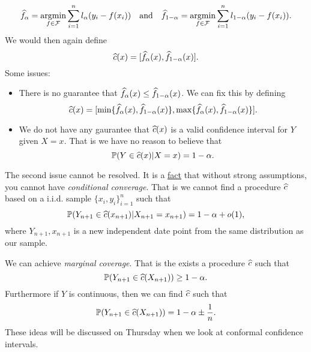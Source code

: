 \[\widehat{f}_{\alpha} = \operatorname*{argmin}_{f\in{\mathcal{F}}} \sum_{i=1}^n l_{\alpha}(y_i-f(x_i))~~~\text{and}~~~ \widehat{f}_{1-{\alpha}} = \operatorname*{argmin}_{f\in {\mathcal{F}}}\sum_{i=1}^n l_{1-{\alpha}}(y_i-f(x_i)).\]
We would then again define
\[\widehat{c}(x)=[\widehat{f}_{\alpha}(x), \widehat{f}_{1-{\alpha}}(x)]. \]
Some issues:
\begin{itemize}
    \item There is no guarantee that $\widehat{f}_{\alpha}(x) \le \widehat{f}_{1-{\alpha}}(x)$. We can fix this by defining
    \[\widehat{c}(x)=[\min\{\widehat{f}_{\alpha}(x), \widehat{f}_{1-{\alpha}}(x)\},\max\{\widehat{f}_{\alpha}(x), \widehat{f}_{1-{\alpha}}(x)\}]. \]
    \item We do not have any gaurantee that $\widehat{c}(x)$ is a valid confidence interval for $Y$ given $X=x$. That is we have no reason to believe that
    \[{\mathbb{P}}(Y \in \widehat{c}(x)|X=x)=1-{\alpha}. \]
\end{itemize}
The second issue cannot be resolved. It is a \underline{fact} that without strong assumptions, you cannot have \emph{conditional converage}. That is we cannot find a procedure $\widehat{c}$ based on a i.i.d. sample $\{x_i,y_i\}_{i=1}^n$ such that 
\[{\mathbb{P}}(Y_{n+1}\in \widehat{c}(x_{n+1})|X_{n+1}=x_{n+1})=1-{\alpha}+o(1), \]
where $Y_{n+1},x_{n+1}$ is a new independent date point from the same distribution as our sample. 

We can achieve \emph{marginal coverage}. That is the exists a procedure $\widehat{c}$ such that 
\[{\mathbb{P}}(Y_{n+1}\in \widehat{c}(X_{n+1}))\ge 1-{\alpha}. \]
Furthermore if $Y$ is continuous, then we can find $\widehat{c}$ such that 
\[{\mathbb{P}}(Y_{n+1} \in \widehat{c}(X_{n+1})) = 1-{\alpha} \pm \frac{1}{n}. \]
These ideas will be discussed on Thursday when we look at conformal confidence intervals. 
